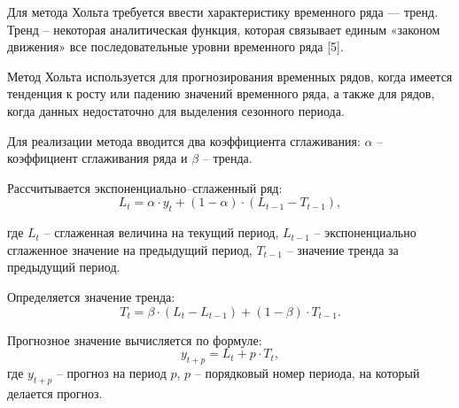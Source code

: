 Для метода Хольта требуется ввести характеристику временного ряда — тренд. Тренд – некоторая аналитическая функция, которая связывает единым 
«законом движения» все последовательные уровни временного ряда [5]. 

Метод Хольта используется для прогнозирования временных рядов, когда имеется тенденция к росту или 
падению значений временного ряда, а также для рядов, когда данных недостаточно для выделения сезонного
периода.

Для реализации метода вводится два коэффициента сглаживания: $\alpha$ – коэффициент сглаживания ряда 
и $\beta$ – тренда.

Рассчитывается экспоненциально–сглаженный ряд: 
\begin{equation}
	L_{t} = \alpha \cdot y_{t} + (1 - \alpha) \cdot (L_{t-1} - T_{t-1}),
\end{equation}

где $L_{t}$ – сглаженная величина на текущий период, $L_{t-1}$ – экспоненциально сглаженное значение 
на предыдущий период, $T_{t-1}$ – значение тренда за предыдущий период.

Определяется значение тренда: 
\begin{equation}
	T_{t} = \beta \cdot (L_{t} - L_{t-1}) + (1 - \beta) \cdot T_{t-1}.
\end{equation}

Прогнозное значение вычисляется по формуле:
\begin{equation}
	y_{t+p} = L_{t} + p \cdot T_{t},
\end{equation}
где $y_{t+p}$ – прогноз на период $p$, $p$ – порядковый номер периода, на который делается прогноз.
